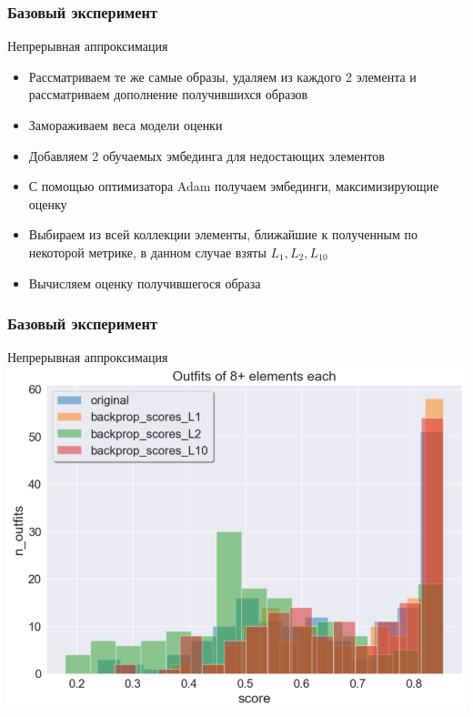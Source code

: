 \documentclass[10pt]{beamer}
\begin{document}
\begin{frame}
	\frametitle{Базовый эксперимент}
	\begin{block}{Непрерывная аппроксимация}
		\begin{itemize}
			\item Рассматриваем те же самые образы, удаляем из каждого 2 элемента и рассматриваем дополнение получившихся образов
			\item Замораживаем веса модели оценки
			\item Добавляем 2 обучаемых эмбединга для недостающих элементов
			\item С помощью оптимизатора Adam получаем эмбединги, максимизирующие оценку
			\item Выбираем из всей коллекции элементы, ближайшие к полученным по некоторой метрике, в данном случае взяты $L_1, L_2, L_{10}$
			\item Вычисляем оценку получившегося образа
		\end{itemize}
	\end{block}
\end{frame}

\begin{frame}
	\frametitle{Базовый эксперимент}
	\begin{block}{Непрерывная аппроксимация}
		\includegraphics[scale = 0.52]{figures/backprop_at_least_8.png}
	\end{block}
\end{frame}
\end{document}
